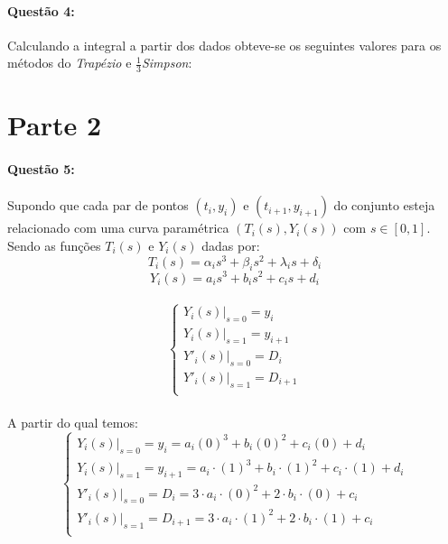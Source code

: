 \documentclass[a4paper,11pt]{article}
\begin{document}

\paragraph{Questão 4:}Calculando a integral a partir dos dados obteve-se os seguintes valores para os métodos do \textit{Trapézio} e $\frac{1}{3}$\textit{Simpson}:

\section{Parte 2}
\paragraph{Questão 5:}Supondo que cada par de pontos $(t_i,y_i)$  e $(t_{i+1},y_{i+1})$ do conjunto esteja relacionado com uma curva paramétrica $(T_i(s),Y_i(s))$ com $s \in [0,1]$. Sendo as funções $T_i(s)$ e $Y_i(s)$ dadas por:
\begin{equation}\label{eq:spline.Ti}
  T_i(s) = \alpha_i s^3 + \beta_i s^2 + \lambda_i s + \delta_i
\end{equation}
\begin{equation}\label{eq:spline.Yi}
  Y_i(s) = a_i s^3 + b_i s^2 + c_i s + d_i
\end{equation}
\paragraph{}%
\begin{equation}
\left\{
\begin{array}{l}
\left.Y_i(s)\right|_{s=0} = y_i \\
\left.Y_i(s)\right|_{s=1} = y_{i+1} \\
\left.Y'_i(s)\right|_{s=0} = D_i \\
\left.Y'_i(s)\right|_{s=1} = D_{i+1} \\
\end{array}
\right.
\end{equation}

\paragraph{}A partir do qual temos:
\begin{equation}
\left\{
\begin{array}{l}
Y_i(s)|_{s=0} = y_i =  a_i (0)^3 + b_i (0)^2 + c_i (0) + d_i \\
Y_i(s)|_{s=1} = y_{i+1} =  a_i\cdot (1)^3 + b_i\cdot (1)^2 + c_i\cdot (1) + d_i\\
Y'_i(s)|_{s=0} = D_i = 3\cdot a_i\cdot (0)^2 + 2\cdot b_i \cdot (0) + c_i\\
Y'_i(s)|_{s=1} = D_{i+1} = 3\cdot a_i\cdot (1)^2 + 2\cdot b_i \cdot (1) + c_i\\
\end{array}
\right.
\end{equation}
\end{document}

